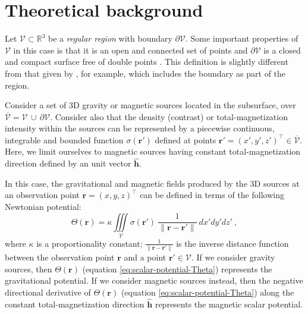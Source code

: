 \section{Theoretical background}
\label{sec:theoretical_background}


Let $\mathcal{V} \subset \mathbb{R}^{3}$ be a \textit{regular region} with boundary
$\partial \mathcal{V}$. 
Some important properties of $\mathcal{V}$ in this case is that it is an open and 
connected set of points and $\partial \mathcal{V}$ is a closed and compact surface 
free of double points \citep[][ p. 22]{freeden_gerhards2012}.
This definition is slightly different from that given by \citet[][ p. 100]{kellogg1967},
for example, which includes the boundary as part of the region.

Consider a set of 3D gravity or magnetic sources located in the subsurface,
over $\overline{\mathcal{V}} = \mathcal{V} \, \cup \, \partial \mathcal{V}$.
Consider also that the density (contrast) or total-magnetization intensity within 
the sources can be represented by a piecewise continuous, integrable and bounded function
$\sigma(\mathbf{r}')$ defined at points 
$\mathbf{r}' = (x', y', z')^{\top} \in \overline{\mathcal{V}}$.
Here, we limit ourselves to magnetic sources having constant total-magnetization direction
defined by an unit vector $\hat{\mathbf{h}}$.

In this case, the gravitational and magnetic fields produced by the 3D sources 
at an observation point $\mathbf{r} = (x, y, z)^{\top}$ 
can be defined in terms of the following Newtonian potential:
\begin{equation}
	\Theta(\mathbf{r}) = \kappa \iiint\limits_{\mathcal{V}}
	\sigma(\mathbf{r}') \: \frac{1}{\| \mathbf{r} - \mathbf{r}'\|}
	\: dx'dy'dz' \: ,
	\label{eq:scalar-potential-Theta}
\end{equation}
where $\kappa$ is a proportionality constant; 
$\tfrac{1}{\| \mathbf{r} - \mathbf{r}' \|}$ is the inverse distance function
between the observation point $\mathbf{r}$ and a point $\mathbf{r}' \in \mathcal{V}$.
If we consider gravity sources, then $\Theta(\mathbf{r})$ 
(equation \ref{eq:scalar-potential-Theta}) represents the gravitational potential.
If we consider magnetic sources instead, then the negative directional 
derivative of $\Theta(\mathbf{r})$ (equation \ref{eq:scalar-potential-Theta}) along
the constant total-magnetization direction $\hat{\mathbf{h}}$ represents the magnetic 
scalar potential.

